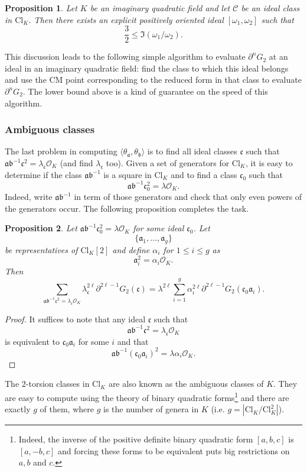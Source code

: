 \documentclass[twoside,10pt]{article}
\newtheorem{prop}{Proposition}
\newcommand{\ida}{\mathfrak{a}}
\newcommand{\idb}{\mathfrak{b}}
\newcommand{\idc}{\mathfrak{c}}
\newcommand{\del}{\partial}
\newcommand{\Clk}{\text{Cl}_K}
\renewcommand{\O}{\mathcal{O}}
\newcommand{\tida}{\theta_\mathfrak{a}}
\newcommand{\latbasis}{[\omega_1,\omega_2]}
\newcommand{\omquot}{\omega_1/\omega_2}
\begin{document}
\begin{prop}
	Let $K$ be an imaginary quadratic field and let $\mathcal{C}$ be an ideal class in $\Clk$. Then there exists an explicit positively oriented ideal $\latbasis$ such that
	\[\frac{3}{2}\leq\Im(\omquot).\]
\end{prop}

This discussion leads to the following simple algorithm to evaluate $\del^nG_2$ at an ideal in an imaginary quadratic field: find the class to which this ideal belongs and use the CM point corresponding to the reduced form in that class to evaluate $\del^nG_2$. The lower bound above is a kind of guarantee on the speed of this algorithm.

\subsubsection{Ambiguous classes}
The last problem in computing $\langle\tida,\theta_\idb\rangle$ is to find all ideal classes $\idc$ such that $\ida\idb^{-1}\idc^2=\lambda_\idc\O_K$ (and find $\lambda_\idc$ too). Given a set of generators for $\Clk$, it is easy to determine if the class $\ida\idb^{-1}$ is a square in $\Clk$ and to find a class $\idc_0$ such that
\[\ida\idb^{-1}\idc_0^2=\lambda\O_K.\]
Indeed, write $\ida\idb^{-1}$ in term of those generators and check that only even powers of the generators occur. The following proposition completes the task.

\begin{prop}
	Let $\ida\idb^{-1}\idc_0^2=\lambda\O_K$ for some ideal $\idc_0$. Let
	\[\{\ida_1,\dots,\ida_g\}\]
	be representatives of $\Clk[2]$ and define $\alpha_i$ for $1\leq i\leq g$ as
	\[\ida_i^2=\alpha_i\O_K.\]
	Then
	\[\sum_{\ida\idb^{-1}\idc^2=\lambda_\idc\O_K}\lambda_\idc^{2\ell}\del^{2\ell-1}G_2(\idc)=\lambda^{2\ell}\sum_{i=1}^g\alpha_i^{2\ell}\del^{2\ell-1}G_2(\idc_0\ida_i).\]
\end{prop}
\begin{proof}
	It suffices to note that any ideal $\idc$ such that
	\[\ida\idb^{-1}\idc^2=\lambda_\idc\O_K\]
	is equivalent to $\idc_0\ida_i$ for some $i$ and that 
	\[\ida\idb^{-1}(\idc_0\ida_i)^2=\lambda\alpha_i\O_K.\]
\end{proof}

The $2$-torsion classes in $\Clk$ are also known as the ambiguous classes of $K$. They are easy to compute using the theory of binary quadratic forms\footnote{Indeed, the inverse of the positive definite binary quadratic form $[a,b,c]$ is $[a,-b,c]$ and forcing these forms to be equivalent puts big restrictions on $a,b$ and $c$.} and there are exactly $g$ of them, where $g$ is the number of genera in $K$ (i.e. $g=|\Clk/\Clk^2|$).
\end{document}

